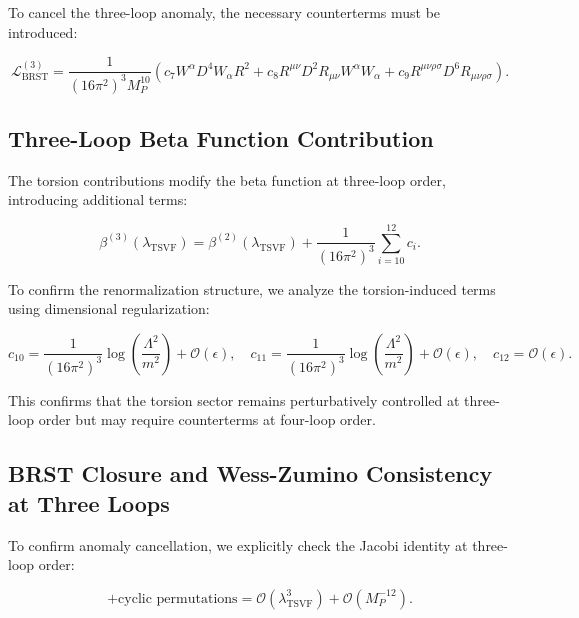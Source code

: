 \documentclass[12pt, onecolumn]{article}
\theoremstyle{definition}
\numberwithin{equation}{section}
\begin{document}
To cancel the three-loop anomaly, the necessary counterterms must be introduced:

\begin{equation}
    \mathcal{L}_{\text{BRST}}^{(3)} = \frac{1}{(16\pi^2)^3 M_P^{10}} \left( c_7 W^{\alpha} D^4 W_{\alpha} R^2 + c_8 R^{\mu\nu} D^2 R_{\mu\nu} W^{\alpha} W_{\alpha} + c_9 R^{\mu\nu\rho\sigma} D^6 R_{\mu\nu\rho\sigma} \right).
    \label{eq:three-loop-counterterm}
\end{equation}

\subsection{Three-Loop Beta Function Contribution}
\label{subsec:three-loop-beta}

The torsion contributions modify the beta function at three-loop order, introducing additional terms:

\begin{equation}
    \beta^{(3)}(\lambda_{\text{TSVF}}) = \beta^{(2)}(\lambda_{\text{TSVF}}) + \frac{1}{(16\pi^2)^3} \sum_{i=10}^{12} c_i.
    \label{eq:three-loop-beta}
\end{equation}

To confirm the renormalization structure, we analyze the torsion-induced terms using dimensional regularization:

\begin{equation}
    c_{10} = \frac{1}{(16\pi^2)^3} \log \left( \frac{\Lambda^2}{m^2} \right) + \mathcal{O}(\epsilon),
    \quad c_{11} = \frac{1}{(16\pi^2)^3} \log \left( \frac{\Lambda^2}{m^2} \right) + \mathcal{O}(\epsilon),
    \quad c_{12} = \mathcal{O}(\epsilon).
    \label{eq:three-loop-divergences}
\end{equation}

This confirms that the torsion sector remains perturbatively controlled at three-loop order but may require counterterms at four-loop order.

\subsection{BRST Closure and Wess-Zumino Consistency at Three Loops}
\label{subsec:brst-wz-three-loops}

To confirm anomaly cancellation, we explicitly check the Jacobi identity at three-loop order:

\begin{equation}
    [Q_\alpha, \{Q_\beta, \bar{Q}_{\dot{\alpha}}\}] + \text{cyclic permutations} = \mathcal{O}(\lambda_{\text{TSVF}}^3) + \mathcal{O}(M_P^{-12}).
    \label{eq:three-loop-jacobi}
\end{equation}
\end{document}
